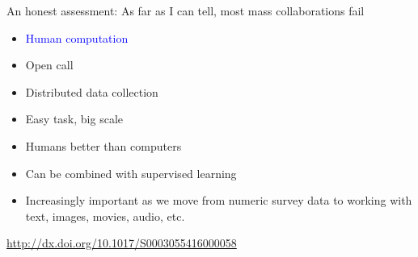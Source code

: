 \documentclass[aspectratio=169]{beamer}
\begin{document}
\begin{frame}

An honest assessment: \pause As far as I can tell, most mass collaborations fail

\end{frame}
\begin{frame}

\begin{itemize}
\item \textcolor{blue}{Human computation}
\item Open call
\item Distributed data collection
\end{itemize}

\end{frame}
\begin{frame}

\begin{itemize}
\item Easy task, big scale
\pause
\item Humans better than computers
\pause
\item Can be combined with supervised learning 
\pause
\item Increasingly important as we move from numeric survey data to working with text, images, movies, audio, etc.
\end{itemize}

\end{frame}
\begin{frame}

\begin{center}
\end{center}

\vfill
{\tiny \url{http://dx.doi.org/10.1017/S0003055416000058}}

\end{frame}
\end{document}
